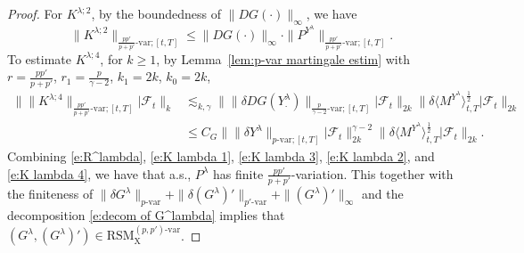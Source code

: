 \documentclass[11pt,reqno]{amsart}
\numberwithin{equation}{section}
\begin{document}
\begin{proof}
For $K^{\lambda;2}$, by the boundedness of $\|DG(\bm\cdot)\|_{\infty}$, we have
\begin{equation}\label{e:K lambda 2}
\|K^{\lambda;2}\|_{\frac{pp'}{p + p'}\text{-}\mathrm{var};[t,T]} \le \|DG(\bm\cdot)\|_{\infty} \cdot \|P^{Y^{\lambda}}\|_{\frac{pp'}{p + p'}\text{-}\mathrm{var};[t,T]}.
\end{equation}
To estimate $K^{\lambda;4}$, for $k\ge 1$, by Lemma~\ref{lem:p-var martingale estim} with $r = \frac{pp'}{p+p'}$, $r_1 = \frac{p}{\gamma - 2}$, $k_1 = 2k$, $k_0 = 2k$, 
\begin{equation}\label{e:K lambda 4}
\begin{aligned}
\big\| \| K^{\lambda;4} \|_{\frac{pp'}{p+p'}\text{-}\mathrm{var};[t,T]} \big| \mathcal F_{t}\big\|_{k} &\lesssim_{k,\gamma} \big\| \|\delta DG(Y^{\lambda}_{\bm\cdot})\|_{\frac{p}{\gamma - 2}\text{-}\mathrm{var};[t,T]} \big| \mathcal F_{t} \big\|_{2k} \big\| \delta \langle M^{Y^{\lambda}} \rangle^{\frac{1}{2}}_{t,T} \big| \mathcal F_{t} \big\|_{2k} \\
&\le C_G \big\| \|\delta Y^{\lambda}\|_{p\text{-}\mathrm{var};[t,T]} \big| \mathcal F_t \big\|^{\gamma - 2}_{2k} \big\| \delta \langle M^{Y^{\lambda}} \rangle^{\frac{1}{2}}_{t,T} \big| \mathcal F_{t} \big\|_{2k}. 
\end{aligned}
\end{equation}
Combining \eqref{e:R^lambda}, \eqref{e:K lambda 1}, \eqref{e:K lambda 3}, \eqref{e:K lambda 2}, and \eqref{e:K lambda 4}, we have that a.s., $P^{\lambda}$ has finite $\frac{pp'}{p+p'}$-variation. This together with the finiteness of $\|\delta G^{\lambda}\|_{p\text{-}\mathrm{var}}+\|\delta (G^{\lambda})'\|_{p'\text{-}\mathrm{var}} + \|(G^{\lambda})'\|_{\infty}$ and the decomposition \eqref{e:decom of G^lambda} implies that $(G^{\lambda},(G^{\lambda})') \in \mathrm{RSM}^{(p,p')\text{-}\mathrm{var}}_{\mathrm X}$.


\end{proof}
\end{document}
